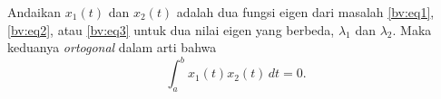 %
%
%

\begin{theorem} \label{bvp:orthogonaleigen}
Andaikan $x_1(t)$ dan $x_2(t)$ adalah dua fungsi eigen dari masalah
\eqref{bv:eq1}, \eqref{bv:eq2}, atau \eqref{bv:eq3}
untuk dua nilai eigen yang berbeda,
$\lambda_1$ dan $\lambda_2$.  Maka keduanya
\emph{ortogonal}
dalam arti bahwa
\begin{equation*}
\int_a^b x_1(t) x_2(t) \,dt = 0 .
\end{equation*}
\end{theorem}

